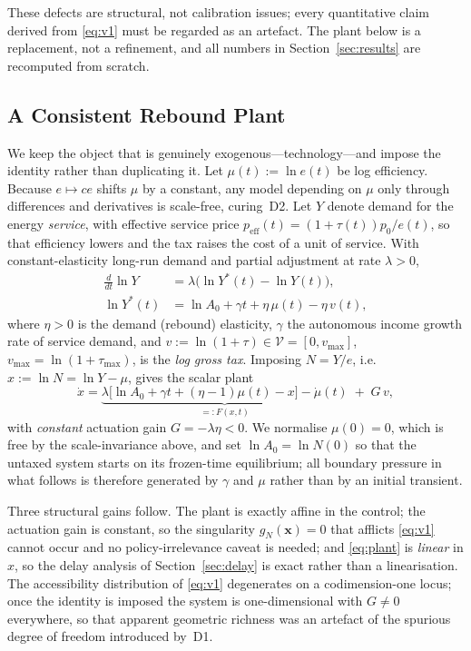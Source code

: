 \documentclass[conference,letterpaper,10pt]{IEEEtran}
\theoremstyle{plain}
\theoremstyle{remark}
\newcommand{\mudot}{\dot{\mu}}
\begin{document}
These defects are structural, not calibration issues; every
quantitative claim derived from \eqref{eq:v1} must be regarded as an
artefact. The plant below is a replacement, not a refinement, and all
numbers in Section~\ref{sec:results} are recomputed from scratch.

\subsection{A Consistent Rebound Plant}
\label{sec:plant}
We keep the object that is genuinely exogenous---technology---and
impose the identity rather than duplicating it. Let
$\mu(t):=\ln e(t)$ be log efficiency. Because $e\mapsto ce$ shifts
$\mu$ by a constant, any model depending on $\mu$ only through
differences and derivatives is scale-free, curing~D2. Let $Y$ denote
demand for the energy \emph{service}, with effective service price
$p_{\text{eff}}(t)=(1+\tau(t))p_0/e(t)$, so that efficiency lowers and
the tax raises the cost of a unit of service. With constant-elasticity
long-run demand and partial adjustment at rate $\lambda>0$,
\begin{equation}
\label{eq:demand}
\begin{aligned}
    \tfrac{d}{dt}\ln Y &= \lambda\big(\ln Y^{\ast}(t) - \ln Y(t)\big), \\
    \ln Y^{\ast}(t) &= \ln A_0 + \gamma t + \eta\,\mu(t) - \eta\, v(t),
\end{aligned}
\end{equation}
where $\eta>0$ is the demand (rebound) elasticity, $\gamma$ the
autonomous income growth rate of service demand, and
$v:=\ln(1+\tau)\in\mathcal{V}=[0,v_{\max}]$, $v_{\max}=\ln(1+\tau_{\max})$,
is the \emph{log gross tax}. Imposing $N=Y/e$, i.e.\
$x:=\ln N=\ln Y-\mu$, gives the scalar plant
\begin{equation}
\label{eq:plant}
    \dot{x} = \underbrace{\lambda\big[\ln A_0 + \gamma t + (\eta-1)\mu(t) - x\big]
              - \mudot(t)}_{=:F(x,t)} \;+\; G\,v ,
\end{equation}
with \emph{constant} actuation gain $G=-\lambda\eta<0$. We normalise
$\mu(0)=0$, which is free by the scale-invariance above, and set
$\ln A_0=\ln N(0)$ so that the untaxed system starts on its frozen-time
equilibrium; all boundary pressure in what follows is therefore
generated by $\gamma$ and $\mu$ rather than by an initial transient.

Three structural gains follow. The plant is exactly affine in the
control; the actuation gain is constant, so the singularity
$g_N(\bm{x})=0$ that afflicts \eqref{eq:v1} cannot occur and no
policy-irrelevance caveat is needed; and \eqref{eq:plant} is
\emph{linear} in $x$, so the delay analysis of
Section~\ref{sec:delay} is exact rather than a linearisation. The
accessibility distribution of \eqref{eq:v1} degenerates on a
codimension-one locus; once the identity is imposed the system is
one-dimensional with $G\neq0$ everywhere, so that apparent geometric
richness was an artefact of the spurious degree of freedom introduced
by~D1.
\end{document}
